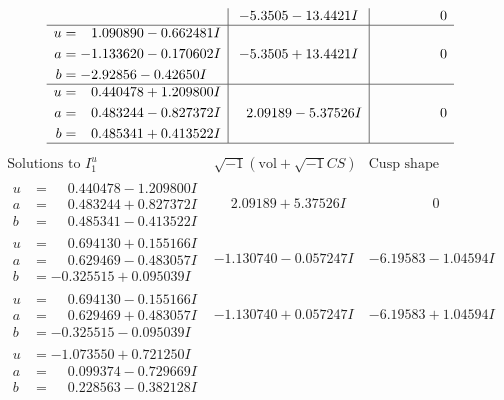 \documentclass[1p]{elsarticle_modified}
\theoremstyle{definition}
\newcommand{\I}{\sqrt{-1}}
\begin{document}
$$\begin{array}{c|c|c}
 & -5.3505 - 13.4421 I & \phantom{-0.000000 } 0 \\ \hline\begin{aligned}
u &= \phantom{-}1.090890 - 0.662481 I \\
a &= -1.133620 - 0.170602 I \\
b &= -2.92856 - 0.42650 I\end{aligned}
 & -5.3505 + 13.4421 I & \phantom{-0.000000 } 0 \\ \hline\begin{aligned}
u &= \phantom{-}0.440478 + 1.209800 I \\
a &= \phantom{-}0.483244 - 0.827372 I \\
b &= \phantom{-}0.485341 + 0.413522 I\end{aligned}
 & \phantom{-}2.09189 - 5.37526 I & \phantom{-0.000000 } 0\\
 \hline 
 \end{array}$$\newpage$$\begin{array}{c|c|c}  
\text{Solutions to }I^u_{1}& \I (\text{vol} + \sqrt{-1}CS) & \text{Cusp shape}\\
 \hline 
\begin{aligned}
u &= \phantom{-}0.440478 - 1.209800 I \\
a &= \phantom{-}0.483244 + 0.827372 I \\
b &= \phantom{-}0.485341 - 0.413522 I\end{aligned}
 & \phantom{-}2.09189 + 5.37526 I & \phantom{-0.000000 } 0 \\ \hline\begin{aligned}
u &= \phantom{-}0.694130 + 0.155166 I \\
a &= \phantom{-}0.629469 - 0.483057 I \\
b &= -0.325515 + 0.095039 I\end{aligned}
 & -1.130740 - 0.057247 I & -6.19583 - 1.04594 I \\ \hline\begin{aligned}
u &= \phantom{-}0.694130 - 0.155166 I \\
a &= \phantom{-}0.629469 + 0.483057 I \\
b &= -0.325515 - 0.095039 I\end{aligned}
 & -1.130740 + 0.057247 I & -6.19583 + 1.04594 I \\ \hline\begin{aligned}
u &= -1.073550 + 0.721250 I \\
a &= \phantom{-}0.099374 - 0.729669 I \\
b &= \phantom{-}0.228563 - 0.382128 I\end{aligned}

\end{array}$$
\end{document}
